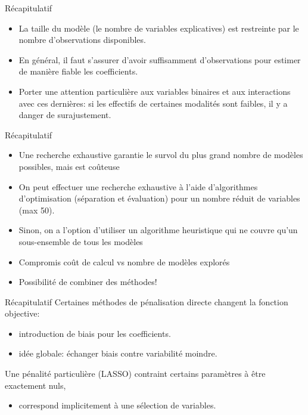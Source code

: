 \documentclass[
  ignorenonframetext,
]{beamer}
\providecommand{\tightlist}{%
  \setlength{\itemsep}{0pt}\setlength{\parskip}{0pt}}\usepackage{longtable,booktabs,array}
\begin{document}
\begin{frame}{Récapitulatif}
\label{ruxe9capitulatif-1}
\begin{itemize}
\tightlist
\item
  La taille du modèle (le nombre de variables explicatives) est
  restreinte par le nombre d'observations disponibles.
\item
  En général, il faut s'assurer d'avoir suffisamment d'observations pour
  estimer de manière fiable les coefficients.
\item
  Porter une attention particulière aux variables binaires et aux
  interactions avec ces dernières: si les effectifs de certaines
  modalités sont faibles, il y a danger de surajustement.
\end{itemize}
\end{frame}

\begin{frame}{Récapitulatif}
\label{ruxe9capitulatif-2}
\begin{itemize}
\tightlist
\item
  Une recherche exhaustive garantie le survol du plus grand nombre de
  modèles possibles, mais est coûteuse
\item
  On peut effectuer une recherche exhaustive à l'aide d'algorithmes
  d'optimisation (séparation et évaluation) pour un nombre réduit de
  variables (max 50).
\item
  Sinon, on a l'option d'utiliser un algorithme heuristique qui ne
  couvre qu'un sous-ensemble de tous les modèles
\item
  Compromis coût de calcul vs nombre de modèles explorés
\item
  Possibilité de combiner des méthodes!
\end{itemize}
\end{frame}

\begin{frame}{Récapitulatif}
\label{ruxe9capitulatif-3}
Certaines méthodes de pénalisation directe changent la fonction
objective:

\begin{itemize}
\tightlist
\item
  introduction de biais pour les coefficients.
\item
  idée globale: échanger biais contre variabilité moindre.
\end{itemize}

Une pénalité particulière (LASSO) contraint certains paramètres à être
exactement nuls,

\begin{itemize}
\tightlist
\item
  correspond implicitement à une sélection de variables.
\end{itemize}
\end{frame}
\end{document}
